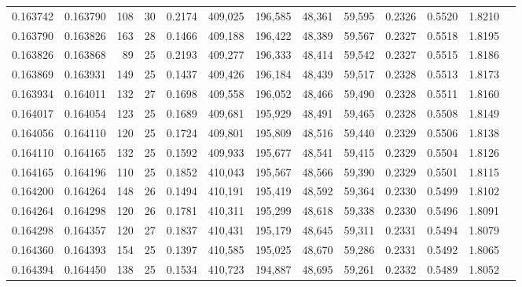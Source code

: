 \begin{tabular}{rrrrrrrrrrrrr}
0.163742 & 0.163790 & 108 &  30 &                                     0.2174 & 409,025 & 196,585 &  48,361 &  59,595 & 0.2326 & 0.5520 & 1.8210 \\
0.163790 & 0.163826 & 163 &  28 &                                     0.1466 & 409,188 & 196,422 &  48,389 &  59,567 & 0.2327 & 0.5518 & 1.8195 \\
0.163826 & 0.163868 &  89 &  25 &                                     0.2193 & 409,277 & 196,333 &  48,414 &  59,542 & 0.2327 & 0.5515 & 1.8186 \\
0.163869 & 0.163931 & 149 &  25 &                                     0.1437 & 409,426 & 196,184 &  48,439 &  59,517 & 0.2328 & 0.5513 & 1.8173 \\
0.163934 & 0.164011 & 132 &  27 &                                     0.1698 & 409,558 & 196,052 &  48,466 &  59,490 & 0.2328 & 0.5511 & 1.8160 \\
0.164017 & 0.164054 & 123 &  25 &                                     0.1689 & 409,681 & 195,929 &  48,491 &  59,465 & 0.2328 & 0.5508 & 1.8149 \\
0.164056 & 0.164110 & 120 &  25 &                                     0.1724 & 409,801 & 195,809 &  48,516 &  59,440 & 0.2329 & 0.5506 & 1.8138 \\
0.164110 & 0.164165 & 132 &  25 &                                     0.1592 & 409,933 & 195,677 &  48,541 &  59,415 & 0.2329 & 0.5504 & 1.8126 \\
0.164165 & 0.164196 & 110 &  25 &                                     0.1852 & 410,043 & 195,567 &  48,566 &  59,390 & 0.2329 & 0.5501 & 1.8115 \\
0.164200 & 0.164264 & 148 &  26 &                                     0.1494 & 410,191 & 195,419 &  48,592 &  59,364 & 0.2330 & 0.5499 & 1.8102 \\
0.164264 & 0.164298 & 120 &  26 &                                     0.1781 & 410,311 & 195,299 &  48,618 &  59,338 & 0.2330 & 0.5496 & 1.8091 \\
0.164298 & 0.164357 & 120 &  27 &                                     0.1837 & 410,431 & 195,179 &  48,645 &  59,311 & 0.2331 & 0.5494 & 1.8079 \\
0.164360 & 0.164393 & 154 &  25 &                                     0.1397 & 410,585 & 195,025 &  48,670 &  59,286 & 0.2331 & 0.5492 & 1.8065 \\
0.164394 & 0.164450 & 138 &  25 &                                     0.1534 & 410,723 & 194,887 &  48,695 &  59,261 & 0.2332 & 0.5489 & 1.8052 \\

\end{tabular}
